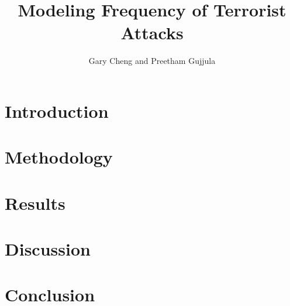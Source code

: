 \documentclass{paper}
\title{Modeling Frequency of Terrorist Attacks}
\author{Gary Cheng and Preetham Gujjula}
\begin{document}
\maketitle 

\section{Introduction}
\section{Methodology}
\section{Results}
\section{Discussion}
\section{Conclusion}
\end{document}
